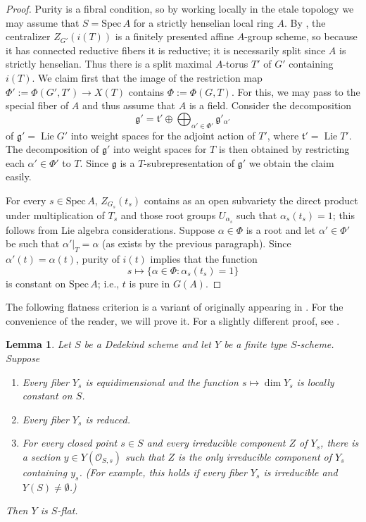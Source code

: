 \documentclass[11pt,reqno]{amsart}
\newtheorem{lemma}[theorem]{Lemma}
\theoremstyle{definition}
\newcommand{\Spec}{\mathrm{Spec} \,}
\newcommand{\sO}{{\mathscr O}}
\newcommand{\fg}{\mathfrak{g}}
\newcommand{\ft}{\mathfrak{t}}
\DeclareMathOperator{\Lie}{Lie}
\begin{document}
\begin{proof}
Purity is a fibral condition, so by working locally in the etale topology we may assume that $S = \Spec A$ for a strictly henselian local ring $A$. By \cite[Lem.\ 2.2.4]{Conrad}, the centralizer $Z_{G'}(i(T))$ is a finitely presented affine $A$-group scheme, so because it has connected reductive fibers it is reductive; it is necessarily split since $A$ is strictly henselian. Thus there is a split maximal $A$-torus $T'$ of $G'$ containing $i(T)$. We claim first that the image of the restriction map $\Phi' := \Phi(G', T') \to X(T)$ contains $\Phi := \Phi(G, T)$. For this, we may pass to the special fiber of $A$ and thus assume that $A$ is a field. Consider the decomposition
\[
\fg' = \ft' \oplus \bigoplus_{\alpha' \in \Phi'} \fg'_{\alpha'}
\]
of $\fg' = \Lie G'$ into weight spaces for the adjoint action of $T'$, where $\ft' = \Lie T'$. The decomposition of $\fg'$ into weight spaces for $T$ is then obtained by restricting each $\alpha' \in \Phi'$ to $T$. Since $\fg$ is a $T$-subrepresentation of $\fg'$ we obtain the claim easily. \smallskip

For every $s \in \Spec A$, $Z_{G_s}(t_s)$ contains as an open subvariety the direct product under multiplication of $T_s$ and those root groups $U_{\alpha_s}$ such that $\alpha_s(t_s) = 1$; this follows from Lie algebra considerations. Suppose $\alpha \in \Phi$ is a root and let $\alpha' \in \Phi'$ be such that $\alpha'|_T = \alpha$ (as exists by the previous paragraph). Since $\alpha'(t) = \alpha(t)$, purity of $i(t)$ implies that the function
\[
s \mapsto \{\alpha \in \Phi: \alpha_s(t_s) = 1\}
\]
is constant on $\Spec A$; i.e., $t$ is pure in $G(A)$.
\end{proof}

The following flatness criterion is a variant of \cite[Prop.\ 6.1]{Gan-Yu} originally appearing in \cite[Lem.\ 4.4]{Booher}. For the convenience of the reader, we will prove it. For a slightly different proof, see \cite[Lem.\ 4.4]{Booher}.

\begin{lemma}\label{lemma:boohers-lemma}
Let $S$ be a Dedekind scheme and let $Y$ be a finite type $S$-scheme. Suppose
\begin{enumerate}
    \item\label{item:equidim-locally-constant} Every fiber $Y_s$ is equidimensional and the function $s \mapsto \dim Y_s$ is locally constant on $S$.
    \item\label{item:reduced} Every fiber $Y_s$ is reduced.
    \item\label{item:enough-sections} For every closed point $s \in S$ and every irreducible component $Z$ of $Y_s$, there is a section $y \in Y(\sO_{S,s})$ such that $Z$ is the only irreducible component of $Y_s$ containing $y_s$. (For example, this holds if every fiber $Y_s$ is irreducible and $Y(S) \neq \emptyset$.)
\end{enumerate}
Then $Y$ is $S$-flat.
\end{lemma}
\end{document}
